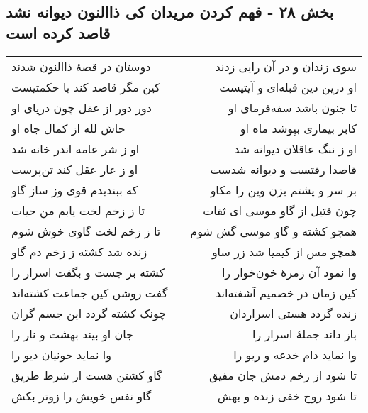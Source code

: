 \begin{center}
\section*{بخش ۲۸ - فهم کردن مریدان کی ذاالنون دیوانه نشد قاصد کرده است}
\label{sec:sh028}
\begin{longtable}{l p{0.5cm} r}
دوستان در قصهٔ ذاالنون شدند
&&
سوی زندان و در آن رایی زدند
\\
کین مگر قاصد کند یا حکمتیست
&&
او درین دین قبله‌ای و آیتیست
\\
دور دور از عقل چون دریای او
&&
تا جنون باشد سفه‌فرمای او
\\
حاش لله از کمال جاه او
&&
کابر بیماری بپوشد ماه او
\\
او ز شر عامه اندر خانه شد
&&
او ز ننگ عاقلان دیوانه شد
\\
او ز عار عقل کند تن‌پرست
&&
قاصدا رفتست و دیوانه شدست
\\
که ببندیدم قوی وز ساز گاو
&&
بر سر و پشتم بزن وین را مکاو
\\
تا ز زخم لخت یابم من حیات
&&
چون قتیل از گاو موسی ای ثقات
\\
تا ز زخم لخت گاوی خوش شوم
&&
همچو کشته و گاو موسی گش شوم
\\
زنده شد کشته ز زخم دم گاو
&&
همچو مس از کیمیا شد زر ساو
\\
کشته بر جست و بگفت اسرار را
&&
وا نمود آن زمرهٔ خون‌خوار را
\\
گفت روشن کین جماعت کشته‌اند
&&
کین زمان در خصمیم آشفته‌اند
\\
چونک کشته گردد این جسم گران
&&
زنده گردد هستی اسراردان
\\
جان او بیند بهشت و نار را
&&
باز داند جملهٔ اسرار را
\\
وا نماید خونیان دیو را
&&
وا نماید دام خدعه و ریو را
\\
گاو کشتن هست از شرط طریق
&&
تا شود از زخم دمش جان مفیق
\\
گاو نفس خویش را زوتر بکش
&&
تا شود روح خفی زنده و بهش
\\
\end{longtable}
\end{center}
